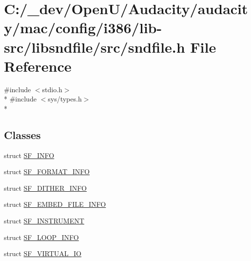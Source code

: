 \hypertarget{mac_2config_2i386_2lib-src_2libsndfile_2src_2sndfile_8h}{}\section{C\+:/\+\_\+dev/\+Open\+U/\+Audacity/audacity/mac/config/i386/lib-\/src/libsndfile/src/sndfile.h File Reference}
\label{mac_2config_2i386_2lib-src_2libsndfile_2src_2sndfile_8h}
{\ttfamily \#include $<$stdio.\+h$>$}\\*
{\ttfamily \#include $<$sys/types.\+h$>$}\\*
\subsection*{Classes}
\begin{DoxyCompactItemize}
\item 
struct \hyperlink{struct_s_f___i_n_f_o}{S\+F\+\_\+\+I\+N\+FO}
\item 
struct \hyperlink{struct_s_f___f_o_r_m_a_t___i_n_f_o}{S\+F\+\_\+\+F\+O\+R\+M\+A\+T\+\_\+\+I\+N\+FO}
\item 
struct \hyperlink{struct_s_f___d_i_t_h_e_r___i_n_f_o}{S\+F\+\_\+\+D\+I\+T\+H\+E\+R\+\_\+\+I\+N\+FO}
\item 
struct \hyperlink{struct_s_f___e_m_b_e_d___f_i_l_e___i_n_f_o}{S\+F\+\_\+\+E\+M\+B\+E\+D\+\_\+\+F\+I\+L\+E\+\_\+\+I\+N\+FO}
\item 
struct \hyperlink{struct_s_f___i_n_s_t_r_u_m_e_n_t}{S\+F\+\_\+\+I\+N\+S\+T\+R\+U\+M\+E\+NT}
\item 
struct \hyperlink{struct_s_f___l_o_o_p___i_n_f_o}{S\+F\+\_\+\+L\+O\+O\+P\+\_\+\+I\+N\+FO}
\item 
struct \hyperlink{struct_s_f___v_i_r_t_u_a_l___i_o}{S\+F\+\_\+\+V\+I\+R\+T\+U\+A\+L\+\_\+\+IO}
\end{DoxyCompactItemize}
